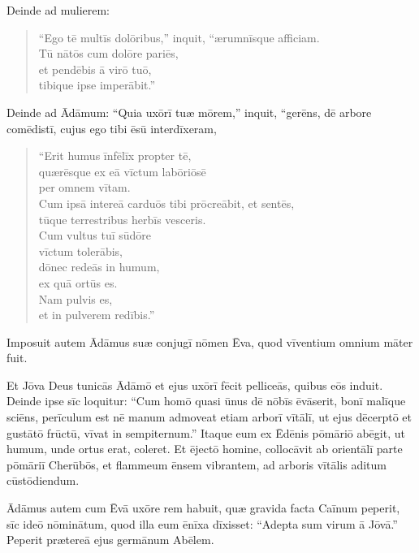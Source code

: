 \Versus Deinde ad mulierem:

\begin{verse}
\begin{patverse*}
 ``Ego tē multīs dolōribus,'' inquit, ``ærumnīsque afficiam. \\
 Tū nātōs cum dolōre pariēs, \\
 et pendēbis ā virō tuō, \\
 tibique ipse imperābit.''
\end{patverse*}
\end{verse}

\Versus Deinde ad Ādāmum: ``Quia uxōrī tuæ mōrem,'' inquit, ``gerēns, dē arbore comēdistī, cujus ego tibi ēsū interdīxeram,

\begin{verse}
\begin{patverse*}
 ``Erit humus īnfēlīx propter tē, \\
 quærēsque ex eā vīctum labōriōsē \\
 per omnem vītam.\\
\Versus Cum ipsā intereā carduōs tibi prōcreābit, et sentēs, \\
 tūque terrestribus herbīs vesceris.\\
\Versus Cum vultus tuī sūdōre \\
 vīctum tolerābis, \\
 dōnec redeās in humum, \\
 ex quā ortūs es. \\
 Nam pulvis es, \\
 et in pulverem redībis.''
\end{patverse*}
\end{verse}

\Versus Imposuit autem Ādāmus suæ conjugī nōmen Ēva, quod vīventium omnium māter fuit.

\Versus Et Jōva Deus tunicās Ādāmō et ejus uxōrī fēcit pelliceās, quibus eōs induit.
\Versus Deinde ipse sīc loquitur: ``Cum homō quasi ūnus dē nōbīs ēvāserit, bonī malīque sciēns, perīculum est nē manum admoveat etiam arborī vītālī, ut ejus dēcerptō et gustātō frūctū, vīvat in sempiternum.''
\Versus Itaque eum ex Ēdēnis pōmāriō abēgit, ut humum, unde ortus erat, coleret. Et ējectō homine, collocāvit ab orientālī parte pōmāriī Cherūbōs, et flammeum ēnsem vibrantem, ad arboris vītālis aditum cūstōdiendum.




\Caput
\Versus Ādāmus autem cum Ēvā uxōre rem habuit, quæ gravida facta Caīnum peperit, sīc ideō nōminātum, quod illa eum ēnīxa dīxisset: ``Adepta sum virum ā Jōvā.''
\Versus Peperit prætereā ejus germānum Abēlem.

